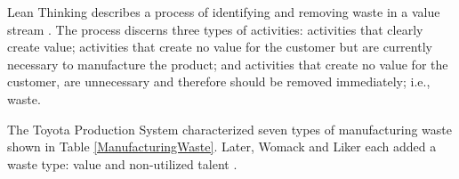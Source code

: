Lean Thinking describes a process of identifying and removing waste in a value stream \cite{WomackLeanThinking}. The process discerns three types of activities: activities that clearly create value; activities that create no value for the customer but are currently necessary to manufacture the product; and activities that create no value for the customer, are unnecessary and therefore should be removed immediately; i.e., waste. 


The Toyota Production System characterized seven types of manufacturing waste \cite{ShingoToyotaProductionSystem} shown in Table \ref{ManufacturingWaste}. Later, Womack and Liker each added a waste type: value and non-utilized talent \cite{WomackLeanThinking, LikerToyotaWay}.

